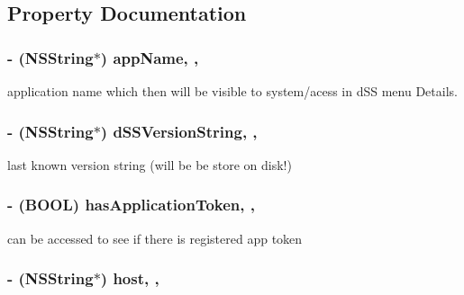 \subsection{Property Documentation}
\hypertarget{interface_m_d_d_s_s_manager_a27147ce2bf5c9186c96503588983c047}{
\subsubsection[{app\-Name}]{\setlength{\rightskip}{0pt plus 5cm}-\/ (N\-S\-String$\ast$) app\-Name\hspace{0.3cm}{\ttfamily [read]}, {\ttfamily [write]}, {\ttfamily [atomic]}}}\label{interface_m_d_d_s_s_manager_a27147ce2bf5c9186c96503588983c047}
application name which then will be visible to system/acess in d\-S\-S menu Details. \hypertarget{interface_m_d_d_s_s_manager_a49c80f7f7f2042658136095fe9f6928f}{
\subsubsection[{d\-S\-S\-Version\-String}]{\setlength{\rightskip}{0pt plus 5cm}-\/ (N\-S\-String$\ast$) d\-S\-S\-Version\-String\hspace{0.3cm}{\ttfamily [read]}, {\ttfamily [write]}, {\ttfamily [atomic]}}}\label{interface_m_d_d_s_s_manager_a49c80f7f7f2042658136095fe9f6928f}
last known version string (will be be store on disk!) \hypertarget{interface_m_d_d_s_s_manager_a25dada9b29593dcd220590d8fdabc58a}{
\subsubsection[{has\-Application\-Token}]{\setlength{\rightskip}{0pt plus 5cm}-\/ (B\-O\-O\-L) has\-Application\-Token\hspace{0.3cm}{\ttfamily [read]}, {\ttfamily [atomic]}, {\ttfamily [assign]}}}\label{interface_m_d_d_s_s_manager_a25dada9b29593dcd220590d8fdabc58a}
can be accessed to see if there is registered app token \hypertarget{interface_m_d_d_s_s_manager_a55aa29ea7dc235519473b2e4ea44c48c}{
\subsubsection[{host}]{\setlength{\rightskip}{0pt plus 5cm}-\/ (N\-S\-String$\ast$) host\hspace{0.3cm}{\ttfamily [read]}, {\ttfamily [write]}, {\ttfamily [atomic]}}}\label{interface_m_d_d_s_s_manager_a55aa29ea7dc235519473b2e4ea44c48c}
